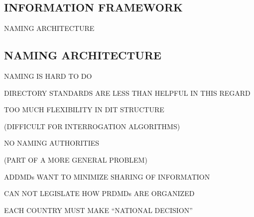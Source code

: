 \begin{bwslide}
\part	{INFORMATION FRAMEWORK}\bf

\begin{nrtc}
\item	NAMING ARCHITECTURE
\end{nrtc}
\end{bwslide}


\begin{bwslide}
\part*	{NAMING ARCHITECTURE}\bf

\begin{nrtc}
\item	NAMING IS HARD TO DO

\item	DIRECTORY STANDARDS ARE LESS THAN HELPFUL IN THIS REGARD
\end{nrtc}
\end{bwslide}


\begin{bwslide}

\begin{nrtc}
\item	TOO MUCH FLEXIBILITY IN DIT STRUCTURE
    \begin{nrtc}
    \item	(DIFFICULT FOR INTERROGATION ALGORITHMS)
    \end{nrtc}

\item	NO NAMING AUTHORITIES
    \begin{nrtc}
    \item	(PART OF A MORE GENERAL PROBLEM)
    \end{nrtc}

\item	ADDMDs WANT TO MINIMIZE SHARING OF INFORMATION

\item	CAN NOT LEGISLATE HOW PRDMDs ARE ORGANIZED

\item	EACH COUNTRY MUST MAKE ``NATIONAL DECISION''
\end{nrtc}
\end{bwslide}




